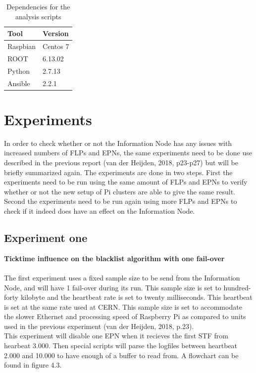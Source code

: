 \begin{table}[ht]
\begin{tabular}{| l | l |}
\hline
Tool & Version \\ \hline
Raspbian & Centos 7 \\ \hline
ROOT & 6.13.02 \\ \hline
Python & 2.7.13 \\ \hline
Ansible & 2.2.1 \\ \hline
\end{tabular}
\caption{Dependencies for the analysis scripts}
\end{table}

\newpage

\section{Experiments}
In order to check whether or not the Information Node has any issues with increased numbers of FLPs and EPNs, the same experiments need to be done use described in the previous report (van der Heijden, 2018, p23-p27) but will be briefly summarized again. The experiments are done in two steps. First the experiments need to be run using the same amount of FLPs and EPNs to verify whether or not the new setup of Pi clusters are able to give the same result. Second the experiments need to be run again using more FLPs and EPNs to check if it indeed does have an effect on the Information Node.

\subsection{Experiment one}
\textbf{Ticktime influence on the blacklist algorithm with one fail-over}
\\\\
The first experiment uses a fixed sample size to be send from the Information Node, and will have 1 fail-over during its run. This sample size is set to hundred-forty kilobyte and 
the heartbeat rate is set to twenty milliseconds. This heartbeat is set at the same rate used at CERN. This sample size is set to accommodate the slower Ethernet and processing speed of Raspberry Pi as compared to units used in the previous experiment (van der Heijden, 2018, p.23). \\
This experiment will disable one EPN when it recieves the first STF from hearbeat 3.000. Then special scripts will parse the logfiles between heartbeat 2.000 and 10.000 to have enough of a buffer to read from. A flowchart can be found in figure 4.3.

